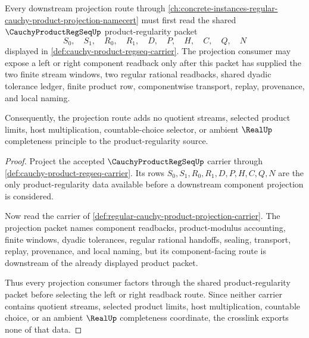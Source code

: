 \begin{theorem}
\label{thm:cauchy-product-regseq-product-projection-crosslink}
Every downstream projection route through \autoref{ch:concrete-instances-regular-cauchy-product-projection-namecert} must first read the shared $\CauchyProductRegSeqUp$ product-regularity packet
$$
S_0,\quad S_1,\quad R_0,\quad R_1,\quad D,\quad P,\quad H,\quad C,\quad Q,\quad N
$$
displayed in \autoref{def:cauchy-product-regseq-carrier}. The projection consumer may expose a left or right component readback only after this packet has supplied the two finite stream windows, two regular rational readbacks, shared dyadic tolerance ledger, finite product row, componentwise transport, replay, provenance, and local naming.

Consequently, the projection route adds no quotient streams, selected product limits, host multiplication, countable-choice selector, or ambient $\RealUp$ completeness principle to the product-regularity source.
\end{theorem}
\begin{proof}
Project the accepted $\CauchyProductRegSeqUp$ carrier through \autoref{def:cauchy-product-regseq-carrier}. Its rows $S_0,S_1,R_0,R_1,D,P,H,C,Q,N$ are the only product-regularity data available before a downstream component projection is considered.

Now read the carrier of \autoref{def:regular-cauchy-product-projection-carrier}. The projection packet names component readbacks, product-modulus accounting, finite windows, dyadic tolerances, regular rational handoffs, sealing, transport, replay, provenance, and local naming, but its component-facing route is downstream of the already displayed product packet.

Thus every projection consumer factors through the shared product-regularity packet before selecting the left or right readback route. Since neither carrier contains quotient streams, selected product limits, host multiplication, countable choice, or an ambient $\RealUp$ completeness coordinate, the crosslink exports none of that data.
\end{proof}
